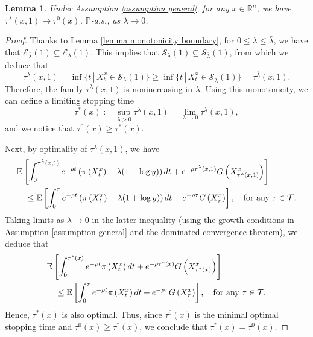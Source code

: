 \documentclass[11pt]{amsart}
\newtheorem{lemma}[theorem]{Lemma}
\theoremstyle{plain}
\def \dd{{\rm d}}
\def \R{\mathbb{R}}
\def \P{\mathbb{P}}
\numberwithin{equation}{section}
\begin{document}
\begin{lemma}
    \label{lemma limits stopping times}
     Under Assumption \ref{assumption general}, for any $x \in \R ^n$, we have $\tau^\lambda (x,1) \to \tau ^0(x)$, $\P$-a.s., as $\lambda \to 0$.
\end{lemma}
\begin{proof}
    Thanks to Lemma \ref{lemma monotonicity boundary}, 
    for $0\leq \lambda \leq \bar \lambda$, we have that
     $\mathcal E_{\bar \lambda} (1) \subseteq   \mathcal E_{ \lambda} (1)$. 
     This implies that $\mathcal S_{ \lambda} (1) \subseteq   \mathcal S_{\bar \lambda} (1)$, from which we deduce that
     $$
     \tau^{\lambda} (x,1) = \inf \{ t \, | \, X_t^x \in \mathcal S _\lambda (1) \} \geq \inf \{ t \, | \, X_t^x \in \mathcal S _{\bar \lambda} (1) \} = \tau^{\bar \lambda} (x,1).
     $$
 Therefore, the family $\tau^\lambda (x,1)$ is nonincreasing in $\lambda$.
 Using this monotonicity, we can define a limiting stopping time 
 $$
 \tau ^*(x):= \sup_{\lambda >0} \tau^\lambda (x,1) = \lim _{\lambda \to 0} \tau^\lambda (x,1),
 $$
 and we notice that $\tau^0(x) \geq \tau^* (x)$.

Next, by optimality of $\tau^\lambda (x,1)$, we have
$$
\begin{aligned}
    &\mathbb{E}\left[\int_{0}^{\tau^\lambda (x,1)} e ^{-\rho t} \left( \pi\left(X^x_{t}\right) - \lambda (1+\log y) \right) \dd t+e^{-\rho {\tau^\lambda (x,1)}} G\left(X^x_{\tau^\lambda (x,1)}\right)\right] \\
    & \quad \leq  \mathbb{E}\left[\int_{0}^{\tau} e ^{-\rho t} \left( \pi\left(X^x_{t}\right) - \lambda (1+\log y) \right) \dd t+e^{-\rho {\tau}} G\left(X^x_{\tau}\right)\right], \quad \text{for any $\tau \in \mathcal T$.}
\end{aligned}
$$
Taking limits as $\lambda \to 0$ in the latter inequality (using the growth conditions in Assumption \ref{assumption general} and the dominated convergence theorem), we deduce that
$$
\begin{aligned}
    &\mathbb{E}\left[\int_{0}^{\tau^* (x)} e ^{-\rho t}  \pi\left(X^x_{t}\right)  \dd t+e^{-\rho {\tau^* (x)}} G\left(X^x_{\tau^* (x)}\right)\right] \\
    & \quad \leq  \mathbb{E}\left[\int_{0}^{\tau} e ^{-\rho t}   \pi\left(X^x_{t}\right) \dd t+e^{-\rho {\tau}} G\left(X^x_{\tau}\right)\right], \quad \text{for any $\tau \in \mathcal T$.}
\end{aligned}
$$
Hence, $\tau^*(x)$ is also optimal. Thus, since   $\tau^0(x)$ is the minimal optimal stopping time and $\tau^0(x) \geq \tau^* (x)$, we conclude that $\tau^*(x) = \tau^0(x)$. 
\end{proof} 
\end{document}
